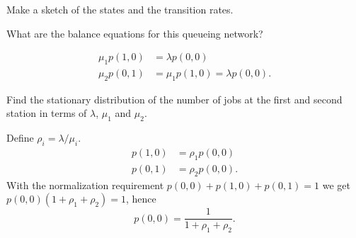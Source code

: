 \begin{exercise}[201704]
Make a sketch of the states and the transition rates.
\begin{solution}
  \begin{center}
    
  \end{center}
\end{solution}
\end{exercise}

\begin{exercise}[201704]
What are the balance equations for this queueing network?
\begin{solution}
  \begin{align*}
    \mu_1 p(1,0) &= \lambda p(0,0) \\
    \mu_2 p(0,1) &= \mu_1 p(1,0) = \lambda p(0,0).
  \end{align*}
\end{solution}
\end{exercise}


\begin{exercise}[201704]
  Find the stationary distribution of the number of jobs at the first
  and second station in terms of $\lambda$, $\mu_1$ and $\mu_2$.
\begin{solution}
Define $\rho_i=\lambda/\mu_i$.
  \begin{align*}
     p(1,0) &= \rho_1 p(0,0) \\
     p(0,1) &= \rho_2 p(0,0).
  \end{align*}
With the normalization requirement $p(0,0)+p(1,0)+p(0,1) = 1$ we get
$p(0,0)(1 + \rho_1 + \rho_2) = 1$, hence
\begin{equation*}
p(0,0)=\frac1{1 + \rho_1 + \rho_2}.
\end{equation*}
\end{solution}
\end{exercise}

